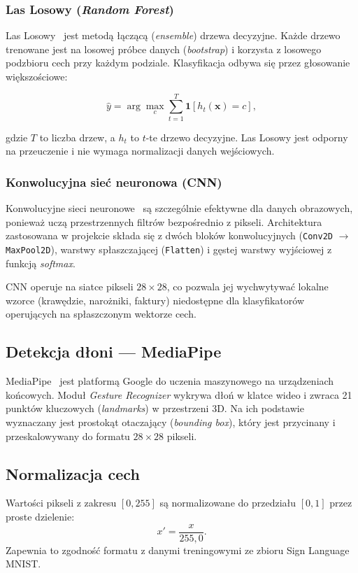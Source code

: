 \subsubsection{Las Losowy (\textit{Random Forest})}

Las Losowy~\cite{breiman2001} jest metodą łączącą (\textit{ensemble}) drzewa
decyzyjne. Każde drzewo trenowane jest na losowej próbce danych
(\textit{bootstrap}) i korzysta z losowego podzbioru cech przy każdym podziale.
Klasyfikacja odbywa się przez głosowanie większościowe:

\begin{equation}
    \hat{y} = \arg\max_{c} \sum_{t=1}^{T} \mathbf{1}[h_t(\mathbf{x}) = c],
\end{equation}

gdzie $T$ to liczba drzew, a $h_t$ to $t$-te drzewo decyzyjne. Las Losowy jest
odporny na przeuczenie i nie wymaga normalizacji danych wejściowych.

\subsubsection{Konwolucyjna sieć neuronowa (CNN)}

Konwolucyjne sieci neuronowe~\cite{lecun1989} są szczególnie efektywne dla danych
obrazowych, ponieważ uczą przestrzennych filtrów bezpośrednio z pikseli.
Architektura zastosowana w projekcie składa się z dwóch bloków konwolucyjnych
(\texttt{Conv2D} $\to$ \texttt{MaxPool2D}), warstwy spłaszczającej (\texttt{Flatten})
i gęstej warstwy wyjściowej z funkcją \textit{softmax}.

CNN operuje na siatce pikseli $28 \times 28$, co pozwala jej wychwytywać
lokalne wzorce (krawędzie, narożniki, faktury) niedostępne dla klasyfikatorów
operujących na spłaszczonym wektorze cech.

\subsection{Detekcja dłoni --- MediaPipe}

MediaPipe~\cite{lugaresi2019} jest platformą Google do uczenia maszynowego
na urządzeniach końcowych. Moduł \textit{Gesture Recognizer} wykrywa dłoń
w klatce wideo i zwraca 21 punktów kluczowych (\textit{landmarks}) w przestrzeni
3D. Na ich podstawie wyznaczany jest prostokąt otaczający (\textit{bounding box}),
który jest przycinany i przeskalowywany do formatu $28 \times 28$ pikseli.

\subsection{Normalizacja cech}

Wartości pikseli z zakresu $[0, 255]$ są normalizowane do przedziału $[0, 1]$
przez proste dzielenie:
\[
    x' = \frac{x}{255{,}0}.
\]
Zapewnia to zgodność formatu z danymi treningowymi ze zbioru Sign Language MNIST.